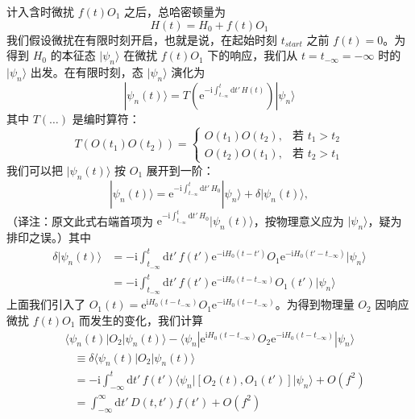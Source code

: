 计入含时微扰 $f(t)O_1$ 之后，总哈密顿量为
\begin{equation*}
H(t)=H_0+f(t)O_1
\end{equation*}
我们假设微扰在有限时刻开启，也就是说，在起始时刻 $t_{start}$ 之前 $f(t)=0$。为得到 $H_0$ 的本征态 $|\psi_n\rangle$ 在微扰 $f(t)O_1$ 下的响应，我们从 $t=t_{-\infty}=-\infty$ 时的 $|\psi_n\rangle$ 出发。在有限时刻，态 $|\psi_n\rangle$ 演化为
\begin{equation*}
|\psi_n(t)\rangle=T\left(\mathrm{e}^{-\mathrm{i}\int_{t_{-\infty}}^t\mathrm{d}t'\,H(t)}\right)|\psi_n\rangle\tag{2.2.2}
\end{equation*}
其中 $T(\dots)$ 是编时算符：
\begin{equation*}
T(O(t_1)O(t_2))=\left\{\begin{array}{ll}
O(t_1)O(t_2), & \text{若 } t_1>t_2\\
O(t_2)O(t_1), & \text{若 } t_2>t_1
\end{array}\right.
\end{equation*}
我们可以把 $|\psi_n(t)\rangle$ 按 $O_1$ 展开到一阶：
\begin{equation*}
|\psi_n(t)\rangle=\mathrm{e}^{-\mathrm{i}\int_{t_{-\infty}}^t\mathrm{d}t'\,H_0}|\psi_n\rangle+\delta|\psi_n(t)\rangle,
\end{equation*}
（译注：原文此式右端首项为 $\mathrm{e}^{-\mathrm{i}\int_{t_{-\infty}}^t\mathrm{d}t'\,H_0}|\psi_n(t)\rangle$，按物理意义应为 $|\psi_n\rangle$，疑为排印之误。）其中
\begin{equation*}
\begin{aligned}
\delta|\psi_n(t)\rangle&=-\mathrm{i}\int_{t_{-\infty}}^t\mathrm{d}t'\,f(t')\mathrm{e}^{-\mathrm{i}H_0(t-t')}O_1\mathrm{e}^{-\mathrm{i}H_0(t'-t_{-\infty})}|\psi_n\rangle\\
&=-\mathrm{i}\int_{t_{-\infty}}^t\mathrm{d}t'\,f(t')\mathrm{e}^{-\mathrm{i}H_0(t-t_{-\infty})}O_1(t')|\psi_n\rangle
\end{aligned}
\end{equation*}
上面我们引入了 $O_1(t)=\mathrm{e}^{\mathrm{i}H_0(t-t_{-\infty})}O_1\mathrm{e}^{-\mathrm{i}H_0(t-t_{-\infty})}$。为得到物理量 $O_2$ 因响应微扰 $f(t)O_1$ 而发生的变化，我们计算
\begin{align*}
&\ \langle\psi_n(t)|O_2|\psi_n(t)\rangle-\langle\psi_n|\mathrm{e}^{\mathrm{i}H_0(t-t_{-\infty})}O_2\mathrm{e}^{-\mathrm{i}H_0(t-t_{-\infty})}|\psi_n\rangle\\
&\quad\equiv\delta\langle\psi_n(t)|O_2|\psi_n(t)\rangle\\
&\quad=-\mathrm{i}\int_{-\infty}^{t}\mathrm{d}t'\,f(t')\langle\psi_n|[O_2(t),O_1(t')]|\psi_n\rangle+O(f^2)\\
&\quad=\int_{-\infty}^{\infty}\mathrm{d}t'\,D(t,t')f(t')+O(f^2)\tag{2.2.3}
\end{align*}
